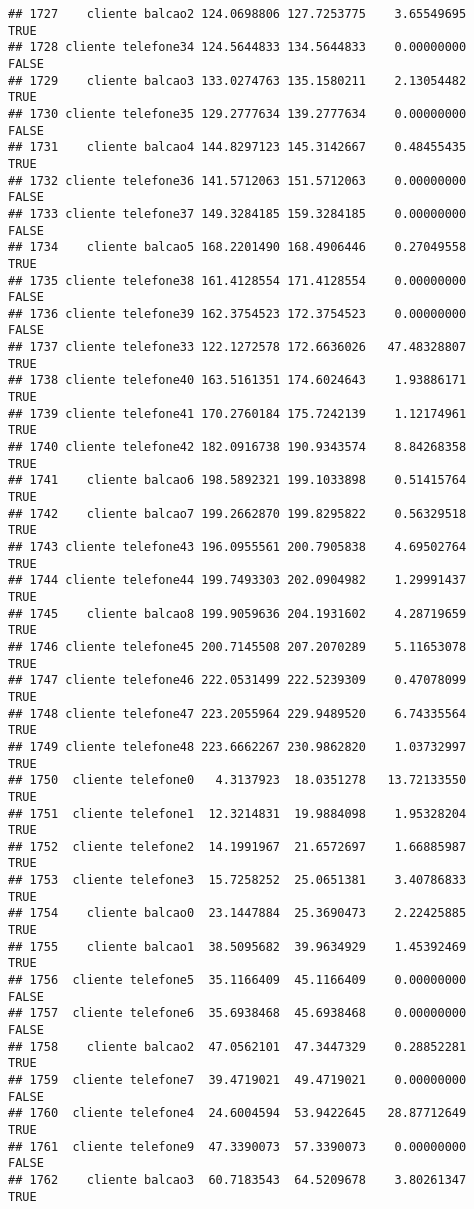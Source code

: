 \documentclass[
]{article}
\begin{document}
\begin{verbatim}
## 1727    cliente balcao2 124.0698806 127.7253775    3.65549695     TRUE
## 1728 cliente telefone34 124.5644833 134.5644833    0.00000000    FALSE
## 1729    cliente balcao3 133.0274763 135.1580211    2.13054482     TRUE
## 1730 cliente telefone35 129.2777634 139.2777634    0.00000000    FALSE
## 1731    cliente balcao4 144.8297123 145.3142667    0.48455435     TRUE
## 1732 cliente telefone36 141.5712063 151.5712063    0.00000000    FALSE
## 1733 cliente telefone37 149.3284185 159.3284185    0.00000000    FALSE
## 1734    cliente balcao5 168.2201490 168.4906446    0.27049558     TRUE
## 1735 cliente telefone38 161.4128554 171.4128554    0.00000000    FALSE
## 1736 cliente telefone39 162.3754523 172.3754523    0.00000000    FALSE
## 1737 cliente telefone33 122.1272578 172.6636026   47.48328807     TRUE
## 1738 cliente telefone40 163.5161351 174.6024643    1.93886171     TRUE
## 1739 cliente telefone41 170.2760184 175.7242139    1.12174961     TRUE
## 1740 cliente telefone42 182.0916738 190.9343574    8.84268358     TRUE
## 1741    cliente balcao6 198.5892321 199.1033898    0.51415764     TRUE
## 1742    cliente balcao7 199.2662870 199.8295822    0.56329518     TRUE
## 1743 cliente telefone43 196.0955561 200.7905838    4.69502764     TRUE
## 1744 cliente telefone44 199.7493303 202.0904982    1.29991437     TRUE
## 1745    cliente balcao8 199.9059636 204.1931602    4.28719659     TRUE
## 1746 cliente telefone45 200.7145508 207.2070289    5.11653078     TRUE
## 1747 cliente telefone46 222.0531499 222.5239309    0.47078099     TRUE
## 1748 cliente telefone47 223.2055964 229.9489520    6.74335564     TRUE
## 1749 cliente telefone48 223.6662267 230.9862820    1.03732997     TRUE
## 1750  cliente telefone0   4.3137923  18.0351278   13.72133550     TRUE
## 1751  cliente telefone1  12.3214831  19.9884098    1.95328204     TRUE
## 1752  cliente telefone2  14.1991967  21.6572697    1.66885987     TRUE
## 1753  cliente telefone3  15.7258252  25.0651381    3.40786833     TRUE
## 1754    cliente balcao0  23.1447884  25.3690473    2.22425885     TRUE
## 1755    cliente balcao1  38.5095682  39.9634929    1.45392469     TRUE
## 1756  cliente telefone5  35.1166409  45.1166409    0.00000000    FALSE
## 1757  cliente telefone6  35.6938468  45.6938468    0.00000000    FALSE
## 1758    cliente balcao2  47.0562101  47.3447329    0.28852281     TRUE
## 1759  cliente telefone7  39.4719021  49.4719021    0.00000000    FALSE
## 1760  cliente telefone4  24.6004594  53.9422645   28.87712649     TRUE
## 1761  cliente telefone9  47.3390073  57.3390073    0.00000000    FALSE
## 1762    cliente balcao3  60.7183543  64.5209678    3.80261347     TRUE

\end{verbatim}
\end{document}
